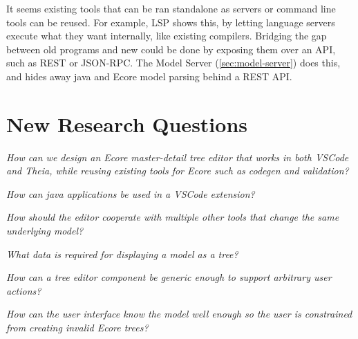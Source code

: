 It seems existing tools that can be ran standalone as servers or command line tools can be reused.
For example, \gls{LSP} shows this, by letting language servers execute what they want internally, like existing compilers.
Bridging the gap between old programs and new could be done by exposing them over an \gls{API}, such as \gls{REST} or \gls{JSON-RPC}. The Model Server (\cref{sec:model-server}) does this, and hides away java and \gls{Ecore} model parsing behind a \gls{REST} \acrshort{API}.


\section{New Research Questions}

\begin{questions}[leftmargin=1cm]
  \item \emph{How can we design an Ecore master-detail tree editor that works in both VSCode and Theia, while reusing existing tools for Ecore such as codegen and validation?}\label{rq:21}
  \begin{questions}
    \item \emph{How can java applications be used in a VSCode extension?}\label{rq:22}
    \item \emph{How should the editor cooperate with multiple other tools that change the same underlying model?}\label{rq:23}
    \item \emph{What data is required for displaying a model as a tree?}\label{rq:24}
    \item \emph{How can a tree editor component be generic enough to support arbitrary user actions?}\label{rq:25}
    \item \emph{How can the user interface know the model well enough so the user is constrained from creating invalid Ecore trees?}\label{rq:26}
  \end{questions}
\end{questions}

